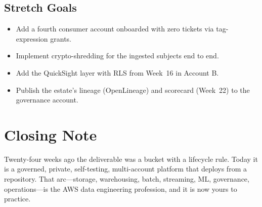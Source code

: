 \subsection*{Stretch Goals}
\begin{itemize}
    \item Add a fourth consumer account onboarded with zero tickets via tag-expression grants.
    \item Implement crypto-shredding for the ingested subjects end to end.
    \item Add the QuickSight layer with RLS from Week~16 in Account B.
    \item Publish the estate's lineage (OpenLineage) and scorecard (Week~22) to the governance account.
\end{itemize}

\section*{Closing Note}
Twenty-four weeks ago the deliverable was a bucket with a lifecycle rule. Today it is a governed, private, self-testing, multi-account platform that deploys from a repository. That arc---storage, warehousing, batch, streaming, ML, governance, operations---is the AWS data engineering profession, and it is now yours to practice.
